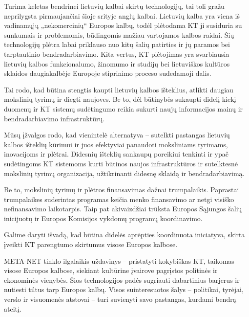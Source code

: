 \begin{multicols}{2}
    Turima keletas bendrinei lietuvių kalbai skirtų technologijų, tai toli gražu neprilygsta pirmaujančiai šioje srityje anglų kalbai. Lietuvių kalba yra viena iš vadinamųjų „nekomercinių“ Europos kalbų, todėl plėtodama KT ji susiduria su sunkumais ir problemomis, būdingomis mažiau vartojamos kalbos raidai. Šių technologijų plėtra labai priklauso nuo kitų šalių patirties ir jų paramos bei tarptautinio bendradarbiavimo. Kita vertus, KT plėtojimas yra svarbiausia lietuvių kalbos funkcionalumo, žinomumo ir studijų bei lietuviškos kultūros sklaidos daugiakalbėje Europoje stiprinimo proceso sudedamoji dalis.   

    Tai rodo, kad būtina stengtis kaupti lietuvių kalbos išteklius, atlikti daugiau mokslinių tyrimų ir diegti naujoves. Be to, dėl būtinybės sukaupti didelį kiekį duomenų ir KT sistemų sudėtingumo reikia sukurti naujų informacijos mainų ir bendradarbiavimo infrastruktūrų.   

Mūsų įžvalgos rodo, kad vienintelė alternatyva – sutelkti pastangas lietuvių kalbos išteklių kūrimui ir juos efektyviai panaudoti moksliniams tyrimams, inovacijoms ir plėtrai. Didesnių išteklių sankaupų poreikiui tenkinti ir ypač sudėtingoms KT sistemoms kurti būtinos naujos infrastruktūros ir sutelktesnė mokslinių tyrimų organizacija, užtikrinanti didesnę sklaidą ir bendradarbiavimą.

    Be to, mokslinių tyrimų ir plėtros finansavimas dažnai trumpalaikis. Paprastai trumpalaikes suderintas programas keičia menko finansavimo ar  netgi visiško nefinansavimo laikotarpis. Taip pat akivaizdžiai trūksta Europos Sąjungos šalių inicijuotų ir Europos Komisijos vykdomų programų koordinavimo.   

    Galime daryti išvadą, kad būtina didelės aprėpties koordinuota iniciatyva, skirta įveikti KT parengtumo skirtumus  visose Europos kalbose.

META-NET tinklo ilgalaikis uždavinys – pristatyti kokybiškas KT, taikomas visose Europos kalbose, siekiant kultūrine įvairove pagrįstos politinės ir ekonominės vienybės. Šios technologijos padės sugriauti dabartinius barjerus ir nutiesti tiltus tarp Europos kalbų. Visos suinteresuotos šalys – politikai, tyrėjai, verslo ir visuomenės atstovai – turi suvienyti savo pastangas, kurdami bendrą ateitį. 


\end{multicols}

